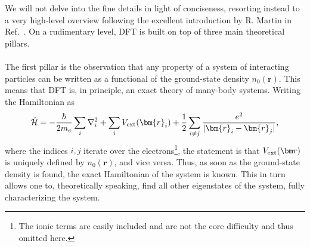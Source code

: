 We will not delve into the fine details in light of conciseness, resorting instead to a very high-level overview following the excellent introduction by R. Martin in Ref.~\cite{Martin2004}.
On a rudimentary level, DFT is built on top of three main theoretical pillars.
\\\\
The first pillar is the observation that any property of a system of interacting particles can be written as a functional of the ground-state density $n_0(\bm{r})$.
This means that DFT is, in principle, an exact theory of many-body systems.
Writing the Hamiltonian as
\begin{equation}
	\hat{\mathcal{H}} = -\frac{\hbar}{2m_e} \sum_i \nabla_i^2 + \sum_i V_{\rm ext}(\bm{r}_i) + \frac{1}{2}\sum_{i\neq j} \frac{e^2}{|\bm{r}_i - \bm{r}_j|},
\end{equation}
where the indices $i,j$ iterate over the electrons\footnote{The ionic terms are easily included and are not the core difficulty and thus omitted here.}, the statement is that $V_{\rm ext}(\bm r)$ is uniquely defined by $n_0(\bm{r})$, and vice versa.
Thus, as soon as the ground-state density is found, the exact Hamiltonian of the system is known.
This in turn allows one to, theoretically speaking, find all other eigenstates of the system, fully characterizing the system.

